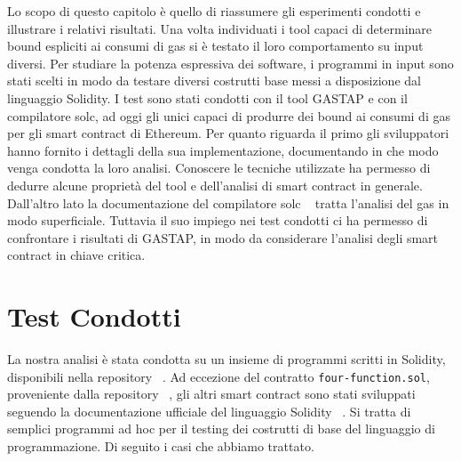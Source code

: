 
Lo scopo di questo capitolo è quello di riassumere gli esperimenti condotti e illustrare i relativi risultati.\newline
\indent Una volta individuati i tool capaci di determinare bound espliciti ai consumi di gas si è testato il loro comportamento su input diversi. Per studiare la potenza espressiva dei software, i programmi in input sono stati scelti in modo da testare diversi costrutti base messi a disposizione dal linguaggio Solidity.\newline
\indent I test sono stati condotti con il tool GASTAP e con il compilatore solc, ad oggi gli unici capaci di produrre dei bound ai consumi di gas per gli smart contract di Ethereum. Per quanto riguarda il primo gli sviluppatori hanno fornito i dettagli della sua implementazione, documentando in che modo venga condotta la loro analisi. Conoscere le tecniche utilizzate ha permesso di dedurre alcune proprietà del tool e dell'analisi di smart contract in generale. Dall'altro lato la documentazione  del compilatore solc ~\cite{solidity-docs} tratta l'analisi del gas in modo superficiale. Tuttavia il suo impiego nei test condotti ci ha permesso di confrontare i risultati di GASTAP, in modo da considerare l'analisi degli smart contract in chiave critica.\newline

\newpage




    


\newpage

\section{Test Condotti}

La nostra analisi è stata condotta su un insieme di programmi scritti in Solidity, disponibili nella repository ~\cite{melastone-sc}.\newline
\indent Ad eccezione del contratto \verb|four-function.sol|, proveniente dalla repository ~\cite{ethir-repository}, gli altri smart contract sono stati sviluppati seguendo la documentazione ufficiale del linguaggio Solidity ~\cite{solidity-docs}. Si tratta di semplici programmi ad hoc per il testing dei costrutti di base del linguaggio di programmazione. Di seguito i casi che abbiamo trattato.\newline

    
